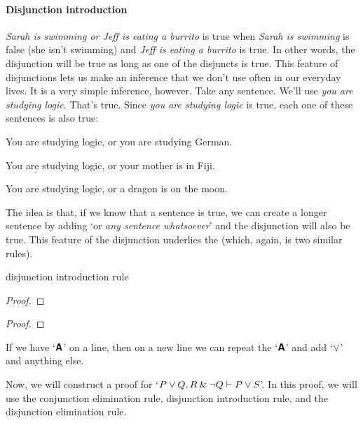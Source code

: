 

\paragraph{Disjunction introduction}
\textit{Sarah is swimming or Jeff is eating a burrito} is true when \textit{Sarah is swimming} is false (she isn't swimming) and \textit{Jeff is eating a burrito} is true. In other words, the disjunction will be true as long as one of the disjuncts is true. This feature of disjunctions lets us make an inference that we don't use often in our everyday lives. It is a very simple inference, however. Take any sentence. We'll use \textit{you are studying logic}. That's true. Since \textit{you are studying logic} is true, each one of these sentences is also true:

\begin{ebullet}
	\item[] You are studying logic, {or} you are studying German.
	\item[] You are studying logic, {or} your mother is in Fiji.
	\item[] You are studying logic, {or} a dragon is on the moon.
\end{ebullet}

\noindent The idea is that, if we know that a sentence is true, we can create a longer sentence by adding `or \textit{any sentence whatsoever}' and the disjunction will also be true. This feature of the disjunction underlies the  (which, again, is two similar rules).

\begin{factboxy}{disjunction introduction rule}\label{di-rule-box}
\begin{proof}
\end{proof}

\begin{proof}
\end{proof}

\small{If we have `$\bm{\mathsf{A}}$' on a line, then on a new line we can repeat the `$\bm{\mathsf{A}}$' and add `$\vee$' and anything else.}

\end{factboxy}
\bigskip

\noindent Now, we will construct a proof for `$P \vee Q, R \mathbin{\&} {\neg} Q \vdash P \vee S$'. In this proof, we will use the conjunction elimination rule, disjunction introduction rule, and the disjunction elimination rule.

